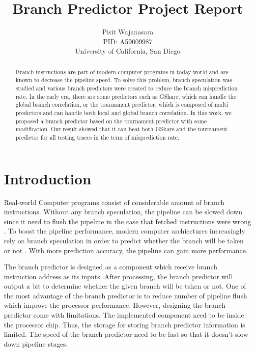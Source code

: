 \documentclass[conference]{IEEEtran}
\title{Branch Predictor Project Report}
\author{Pisit Wajanasara\\
PID: A59009987\\
University of California, San Diego}
\begin{document}
\maketitle
\thispagestyle{firstpage}
\pagestyle{plain}




\begin{abstract}

Branch instructions are part of modern computer programs in today world and are known to decrease
the pipeline speed. To solve this problem, branch speculation was studied and various branch predictors
were created to reduce the branch misprediction rate. In the early era, there are some predictors such as
GShare, which can handle the global branch correlation, or the tournament predictor, which is composed
of multi predictors and can handle both local and global branch correlation. In this work, we proposed
a branch predictor based on the tournament predictor with some modification. Our result showed that
it can beat both GShare and the tournament predictor for all testing traces in the term of misprediction rate.

\end{abstract}

\section{Introduction}

Real-world Computer programs consist of considerable amount of branch instructions. Without any branch speculation,
the pipeline can be slowed down since it need to flush the pipeline in the case that fetched instructions were wrong \cite{bp_survey1}.
To boost the pipeline performance, modern computer archiectures increasingly rely on branch speculation in order
to predict whether the branch will be taken or not \cite{perceptron_predictor}. With more prediction accuracy, the pipeline can gain more performance.

The branch predictor is designed as a component which receive branch instruction address as its inputs. After processing,
the branch predictor will output a bit to determine whether the given branch will be taken or not. One of the most
advantage of the branch predictor is to reduce number of pipeline flush which improve the processor performance. However,
designing the branch predictor come with limitations. The implemented component need to be inside the processor chip.
Thus, the storage for storing branch predictor information is limited. The speed of the branch predictor need to be fast
so that it doesn't slow down pipeline stages.
\end{document}
